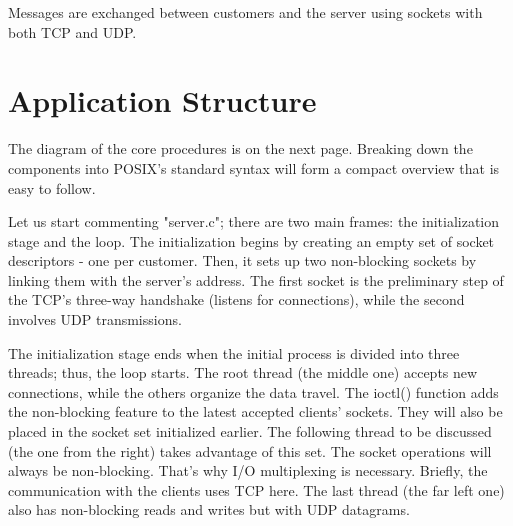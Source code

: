 \documentclass[runningheads]{llncs}
\begin{document}
Messages are exchanged between customers and the server using sockets with both TCP and UDP.


\section{Application Structure}

The diagram of the core procedures is on the next page. Breaking down the components into POSIX's standard syntax will form a compact overview that is easy to follow.

Let us start commenting "server.c"; there are two main frames: the initialization stage and the loop. The initialization begins by creating an empty set of socket descriptors - one per customer. Then, it sets up two non-blocking sockets by linking them with the server's address. The first socket is the preliminary step of the TCP's three-way handshake (listens for connections), while the second involves UDP transmissions.

The initialization stage ends when the initial process is divided into three threads; thus, the loop starts. The root thread (the middle one) accepts new connections, while the others organize the data travel. The ioctl() function adds the non-blocking feature to the latest accepted clients' sockets. They will also be placed in the socket set initialized earlier. The following thread to be discussed (the one from the right) takes advantage of this set. The socket operations will always be non-blocking. That's why I/O multiplexing is necessary. Briefly, the communication with the clients uses TCP here. The last thread (the far left one) also has non-blocking reads and writes but with UDP datagrams.
\end{document}
